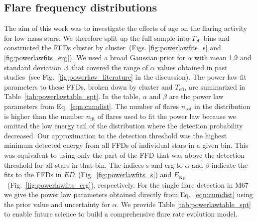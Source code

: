 \documentclass{aa}
\begin{document}
\subsection{Flare frequency distributions}
\label{sec:sec:ffds}
The aim of this work was to investigate the effects of age on the flaring activity for low mass stars. We therefore split up the full sample into $T_\mathrm{eff}$ bins and constructed the FFDs cluster by cluster~(Figs. \ref{fig:powerlawfits_s} and \ref{fig:powerlawfits_erg}). We used a broad Gaussian prior for $\alpha$ with mean 1.9 and standard deviation .4 that covered the range of $\alpha$ values obtained in past studies~(see Fig.~\ref{fig:powerlaw_literature} in the discussion). The power law fit parameters to these FFDs, broken down by cluster and $T_\mathrm{eff}$, are summarized in Table~\ref{tab:powerlawtable_spt}. In the table, $\alpha$ and $\beta$ are the power law parameters from Eq.~\ref{eqn:cumdist}. The number of flares $n_\mathrm{tot}$ in the distribution is higher than the number $n_\mathrm{fit}$ of flares used to fit the power law because we omitted the low energy tail of the distribution where the detection probability decreased. Our approximation to the detection threshold was the highest minimum detected energy
from all FFDs of individual stars in a given bin. This was equivalent to using only the part of the FFD that was above the detection threshold for all stars in that bin. The indices s and erg to $\alpha$ and $\beta$ indicate the fits to the FFDs in $ED$~(Fig.~\ref{fig:powerlawfits_s}) and $E_\mathrm{Kp}$~(Fig.~\ref{fig:powerlawfits_erg}), respectively. For the single flare detection in M67 we give the power law parameters obtained directly from Eq.~\ref{eqn:cumdist} using the prior value and uncertainty for $\alpha$. We provide Table \ref{tab:powerlawtable_spt} to enable future science to build a comprehensive flare rate evolution model.
\end{document}
